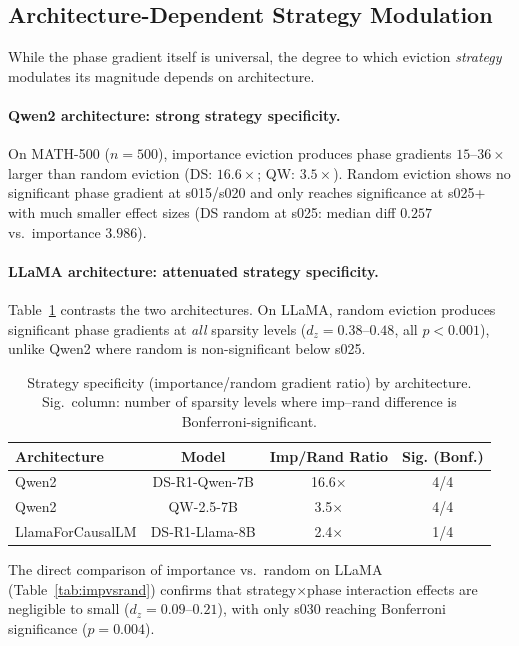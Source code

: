 \documentclass[11pt,a4paper]{article}
\begin{document}
\subsection{Architecture-Dependent Strategy Modulation}
\label{sec:strategy}

While the phase gradient itself is universal, the degree to which eviction \emph{strategy} modulates its magnitude depends on architecture.

\paragraph{Qwen2 architecture: strong strategy specificity.} On MATH-500 ($n = 500$), importance eviction produces phase gradients $15$--$36\times$ larger than random eviction (DS: $16.6\times$; QW: $3.5\times$). Random eviction shows no significant phase gradient at s015/s020 and only reaches significance at s025+ with much smaller effect sizes (DS random at s025: median diff $0.257$ vs.\ importance $3.986$).

\paragraph{LLaMA architecture: attenuated strategy specificity.} Table~\ref{tab:strategy} contrasts the two architectures. On LLaMA, random eviction produces significant phase gradients at \emph{all} sparsity levels ($d_z = 0.38$--$0.48$, all $p < 0.001$), unlike Qwen2 where random is non-significant below s025.

\begin{table}[t]
\centering
\small
\begin{tabular}{lccc}
\toprule
Architecture & Model & Imp/Rand Ratio & Sig. (Bonf.) \\
\midrule
Qwen2 & DS-R1-Qwen-7B & 16.6$\times$ & 4/4 \\
Qwen2 & QW-2.5-7B & 3.5$\times$ & 4/4 \\
LlamaForCausalLM & DS-R1-Llama-8B & 2.4$\times$ & 1/4 \\
\bottomrule
\end{tabular}
\caption{Strategy specificity (importance/random gradient ratio) by architecture. Sig.\ column: number of sparsity levels where imp--rand difference is Bonferroni-significant.}
\label{tab:strategy}
\end{table}

The direct comparison of importance vs.\ random on LLaMA (Table~\ref{tab:impvsrand}) confirms that strategy$\times$phase interaction effects are negligible to small ($d_z = 0.09$--$0.21$), with only s030 reaching Bonferroni significance ($p = 0.004$).
\end{document}
